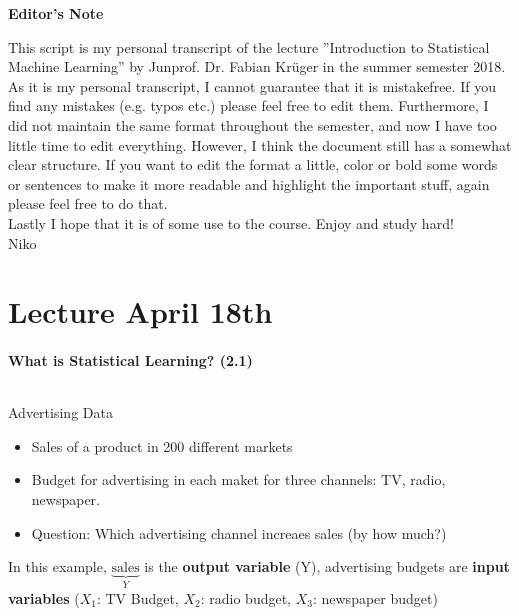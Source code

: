 \documentclass[11pt,a4paper,numbers=endperiod]{scrartcl}
\newcommand{\tit}[1]{\begin{large} \underline{\text{#1}}\end{large}}
\begin{document}
	\begin{center}
		{\large \text{\today}}
	\end{center}
	
	\newpage
	\vspace{0.125\baselineskip}
	\tableofcontents %
	\newpage
	\begin{center}
		\LARGE \textbf{Editor's Note}
	\end{center}
	This script is my personal transcript of the lecture ''Introduction to Statistical Machine Learning'' by Junprof. Dr. Fabian Krüger in the summer semester 2018. As it is my personal transcript, I cannot guarantee that it is mistakefree. If you find any mistakes (e.g. typos etc.) please feel free to edit them. Furthermore, I did not maintain the same format throughout the semester, and now I have too little time to edit everything. However, I think the document still has a somewhat clear structure. If you want to edit the format a little, color or bold some words or sentences to make it more readable and highlight the important stuff, again please feel free to do that.\\
	Lastly I hope that it is of some use to the course. Enjoy and study hard!\\
	Niko
	\newpage
	\section{Lecture April 18th}
	\vspace{0.2\baselineskip}
	
	\onehalfspacing

\paragraph{What is Statistical Learning? (2.1)}
$ $\\

\tit{Example:} Advertising Data
	\begin{itemize}[label={--}]
		\item Sales of a product in 200 different markets
		\item Budget for advertising in each maket for three channels: TV, radio, newspaper.
		\item Question: Which advertising channel increaes sales (by how much?)
	\end{itemize}
In this example, $\underbrace{\text{sales}}_{Y}$ is the \textbf{output variable} (Y), advertising budgets are \textbf{input variables} ($X_1$: TV Budget, $X_2$: radio budget, $X_3$: newspaper budget) 
\end{document}
